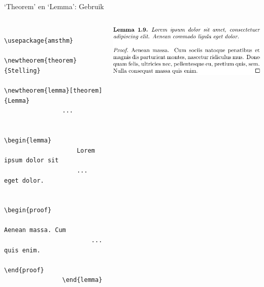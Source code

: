 \copyrightVincent

\begin{frame}[fragile]{`Theorem' en `Lemma': Gebruik}
    \begin{columns}
        \begin{column}{0.4\textwidth}
            \begin{verbatim}
                \usepackage{amsthm}
                \newtheorem{theorem}{Stelling}
                \newtheorem{lemma}[theorem]{Lemma}
                ...

                \begin{lemma}
                    Lorem ipsum dolor sit
                    ... eget dolor.
                    
                    \begin{proof}
                        Aenean massa. Cum
                        ... quis enim.
                    \end{proof}
                \end{lemma}
            \end{verbatim}
        \end{column}
        \begin{column}{0.4\textwidth}
            \includegraphics[width=\linewidth,height=0.8\textheight,keepaspectratio]{assets/mathLemmaProof.pdf}
        \end{column}
    \end{columns}
\end{frame}
